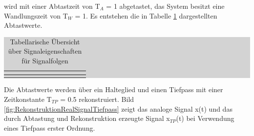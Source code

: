 \noindent wird mit einer Abtastzeit von T$_{A}$ = 1 abgetastet, das System besitzt eine Wandlungszeit von T$_{W}$ = 1. Es entstehen die in Tabelle \ref{tab:twoone} dargestellten Abtastwerte.

\clearpage
\begin{table}[H]
\setlength{\arrayrulewidth}{.1em}
\caption{Tabellarische Übersicht über Signaleigenschaften für Signalfolgen}

\setlength{\fboxsep}{0pt}%
\colorbox{lightgray}{%
%
\begin{tabular}{| c | c | c | c | c | c | c | c | c | c | c | c |}
\hline
\parbox[c][0.45in][c]{0.45in}{\smallskip\centering\textbf{}} & 
\parbox[c][0.37in][c]{0.37in}{} & 
\parbox[c][0.37in][c]{0.37in}{} & 
\parbox[c][0.37in][c]{0.37in}{} & 
\parbox[c][0.37in][c]{0.37in}{} & 
\parbox[c][0.37in][c]{0.37in}{} & 
\parbox[c][0.37in][c]{0.37in}{} & 
\parbox[c][0.37in][c]{0.37in}{} & 
\parbox[c][0.37in][c]{0.37in}{} & 
\parbox[c][0.37in][c]{0.37in}{} & 
\parbox[c][0.37in][c]{0.37in}{} & 
\parbox[c][0.37in][c]{0.37in}{}\\  \hline
\parbox[c][0.45in][c]{0.45in}{\smallskip\centering\textbf{}} & 
\parbox[c][0.37in][c]{0.37in}{} & 
\parbox[c][0.37in][c]{0.37in}{} & 
\parbox[c][0.37in][c]{0.37in}{} & 
\parbox[c][0.37in][c]{0.37in}{} & 
\parbox[c][0.37in][c]{0.37in}{} & 
\parbox[c][0.37in][c]{0.37in}{} & 
\parbox[c][0.37in][c]{0.37in}{} & 
\parbox[c][0.37in][c]{0.37in}{} & 
\parbox[c][0.37in][c]{0.37in}{} & 
\parbox[c][0.37in][c]{0.37in}{} & 
\parbox[c][0.37in][c]{0.37in}{}\\ \hline

\end{tabular}%
}
\label{tab:twoone}
\end{table}


\noindent Die Abtastwerte werden über ein Halteglied und einen Tiefpass mit einer Zeitkonstante T${}_{TP}$ = 0.5 rekonstruiert. Bild \ref{fig:RekonstruktionRealSignalTiefpass} zeigt das analoge Signal x(t) und das durch Abtastung und Rekonstruktion erzeugte Signal x${}_{TP}$(t) bei Verwendung eines Tiefpass erster Ordnung.

